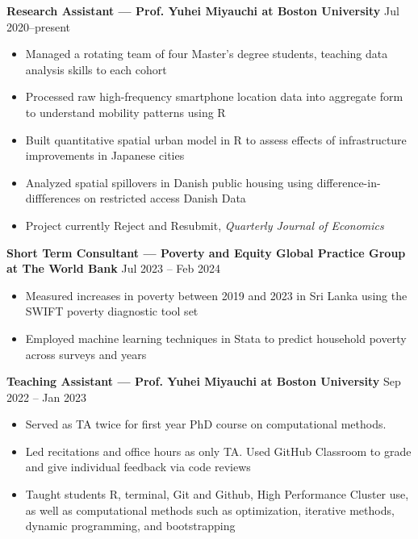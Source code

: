 \documentclass[10pt]{article}
\newenvironment{customitemize}
{ \begin{itemize}[leftmargin=\parindent, topsep = 0.2pt, itemsep = -3pt] }
{\end{itemize} }
\begin{document}
\noindent \textbf{Research Assistant --- Prof. Yuhei Miyauchi at Boston University}  \hfill Jul 2020--present 
\begin{customitemize}
	\item Managed a rotating team of four Master's degree students, teaching data analysis skills to each cohort
	\item Processed raw high-frequency smartphone location data into aggregate form to understand mobility patterns using R
	\item Built quantitative spatial urban model in R to assess effects of infrastructure improvements in Japanese cities
	\item Analyzed spatial spillovers in Danish public housing using difference-in-diffferences on restricted access Danish Data
	\item Project currently Reject and Resubmit, \textit{Quarterly Journal of Economics}
\end{customitemize}

\noindent \textbf{Short Term Consultant --- Poverty and Equity Global Practice Group at The World Bank}  \hfill Jul 2023 -- Feb 2024
\begin{customitemize}
	\item Measured increases in poverty between 2019 and 2023 in Sri Lanka using the SWIFT poverty diagnostic tool set
	\item Employed machine learning techniques in Stata to predict household poverty across surveys and years
\end{customitemize}

\noindent \textbf{Teaching Assistant --- Prof. Yuhei Miyauchi at Boston University}  \hfill Sep 2022 -- Jan 2023
\begin{customitemize}
	\item Served as TA twice for first year PhD course on computational methods. 
	\item Led recitations and office hours as only TA. Used GitHub Classroom to grade and give individual feedback via code reviews
	\item Taught students R, terminal, Git and Github, High Performance Cluster use, as well as computational methods such as optimization, iterative methods, dynamic programming, and bootstrapping 
\end{customitemize}

\end{document}
